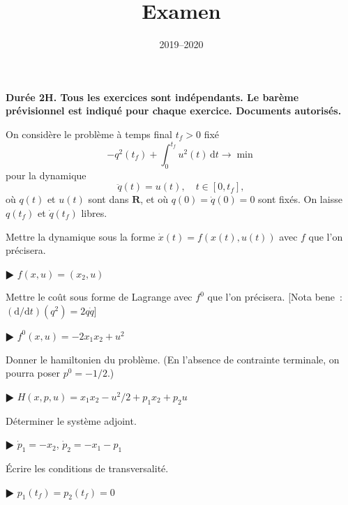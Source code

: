 \documentclass[11pt,a4paper]{article}
\title{Examen}
\date{2019--2020}
\def\R{\mathbf{R}}
\def\d{\mathrm{d}}
\theoremstyle{plain}
\theoremstyle{definition}
\begin{document}
\maketitle

{\bf Dur\'ee 2H. Tous les exercices sont ind\'ependants.
Le bar\`eme pr\'e\-vi\-sion\-nel est indiqu\'e pour chaque exercice.
Documents autoris\'es.}%

\begin{Exercice}[8 points] On consid\`ere le probl\`eme \`a temps final $t_f>0$ fix\'e
\[ -q^2(t_f)+\int_0^{t_f} u^2(t)\,\d t \to \min \]
pour la dynamique
\[ \ddot{q}(t)=u(t),\quad t \in [0,t_f], \]
o\`u $q(t)$ et $u(t)$ sont dans $\R$, et o\`u $q(0)=\dot{q}(0)=0$ sont
fix\'es. On laisse $q(t_f)$ et $\dot{q}(t_f)$ libres.
\begin{Question} Mettre la dynamique sous la forme $\dot{x}(t)=f(x(t),u(t))$ avec $f$
que l'on pr\'ecisera.
\end{Question}
\begin{corr} $\RHD$ $f(x,u)=(x_2,u)$
\end{corr}

\begin{Question} Mettre le co\^ut sous forme de Lagrange avec $f^0$ que l'on
pr\'ecisera. [Nota bene~: $(\d /\d t)(q^2)=2q\dot{q}$]
\end{Question}
\begin{corr} $\RHD$ $f^0(x,u)=-2x_1x_2+u^2$ 
\end{corr}

\begin{Question} Donner le hamiltonien du probl\`eme. (En l'absence de contrainte
terminale, on pourra poser $p^0=-1/2$.)
\end{Question}
\begin{corr} $\RHD$ $H(x,p,u)=x_1x_2-u^2/2+p_1x_2+p_2u$
\end{corr}

\begin{Question} D\'eterminer le syst\`eme adjoint.
\end{Question}
\begin{corr} $\RHD$ $\dot{p}_1=-x_2$, $\dot{p}_2=-x_1-p_1$
\end{corr}

\begin{Question} \'Ecrire les conditions de transversalit\'e. 
\end{Question}
\begin{corr} $\RHD$ $p_1(t_f)=p_2(t_f)=0$
\end{corr}


\end{Exercice}
\end{document}
